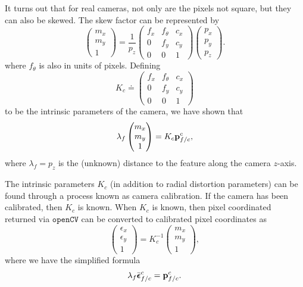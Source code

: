 It turns out that for real cameras, not only are the pixels not square, but they can also be skewed.  The skew factor can be represented by\cite{MaSoattoKoseckaSastry03}
\[
\begin{pmatrix}m_x \\ m_y \\ 1\end{pmatrix} 
	= \frac{1}{p_z}\begin{pmatrix} f_x & f_\theta & c_x \\ 0 & f_y & c_y \\ 0 & 0 & 1 \end{pmatrix}\begin{pmatrix}p_x \\ p_y \\ p_z \end{pmatrix}.
\]
where $f_\theta$ is also in units of pixels.  
Defining 
\[
K_c \doteq \begin{pmatrix}f_x & f_\theta & c_x \\ 0 & f_y & c_y \\ 0 & 0 & 1\end{pmatrix}
\]
to be the intrinsic parameters of the camera, we have shown that 
\begin{equation}\label{eq:pin_hole_pixel}
\lambda_f \begin{pmatrix} m_x \\ m_y \\ 1 \end{pmatrix} = K_c \pbf_{f/c}^c,
\end{equation}
where $\lambda_f = p_z$ is the (unknown) distance to the feature along the camera $z$-axis.  

The intrinsic parameters $K_c$ (in addition to radial distortion parameters) can be found through a process known as camera calibration.  If the camera has been calibrated, then $K_c$ is known.  When $K_c$ is known, then pixel coordinated returned via $\texttt{openCV}$ can be converted to calibrated pixel coordinates as 
\begin{equation}\label{eq:calibrated_normalized_homogeneous_coord}
\begin{pmatrix} \epsilon_x \\ \epsilon_y \\ 1 \end{pmatrix} = K_c^{-1} \begin{pmatrix} m_x \\ m_y \\ 1 \end{pmatrix},
\end{equation}
where we have the simplified formula
\[
\lambda_f \bar{\boldsymbol{\epsilon}}_{f/c}^c = \mathbf{p}_{f/c}^c.
\]

